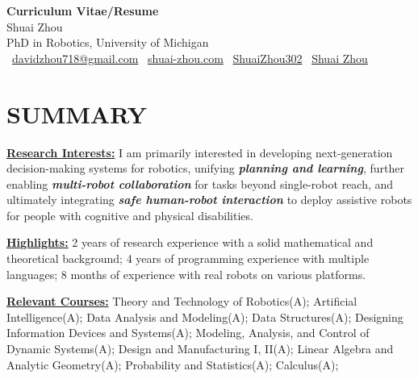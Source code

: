 \documentclass[a4paper,9pt]{extarticle}
\begin{document}
\pagestyle{fancy}
\renewcommand{\headrulewidth}{0pt}
\fancyhead{}
\thispagestyle{empty} %

\begin{center}
\textbf{\Huge Curriculum Vitae/Resume}\\[2pt] %
Shuai Zhou \\[2pt] PhD in Robotics, University of Michigan \\[2pt]
\faEnvelope\ \href{mailto:davidzhou718@gmail.com}{davidzhou718@gmail.com}
\quad \textbar{} \quad
\faHome\ \href{https://www.shuai-zhou.com}{shuai-zhou.com}
\quad \textbar{} \quad
\faGithub\ \href{https://github.com/ShuaiZhou302}{ShuaiZhou302}
\quad \textbar{} \quad
\faGraduationCap\ \href{https://scholar.google.com/citations?user=ONn1TXAAAAAJ&hl=en&oi=sra}{Shuai Zhou}
\end{center}

\section*{{\textbf{\fontsize{14pt}{8pt}\selectfont S}\textbf{\scshape UMMARY}}}
\underline{\textbf{Research Interests:}} I am primarily interested in developing next-generation decision-making systems for robotics, unifying \textit{\textbf{planning and learning}}, further enabling \textit{\textbf{multi-robot collaboration}} for tasks beyond single-robot reach, and ultimately integrating \textit{\textbf{safe human-robot interaction}} to deploy assistive robots for people with cognitive and physical disabilities.
\par\vspace{4pt}\noindent
\underline{\textbf{Highlights:}} 2 years of research experience with a solid mathematical and theoretical background; 4 years of programming experience with multiple languages; 8 months of experience with real robots on various platforms.
\par\vspace{4pt}\noindent
\underline{\textbf{Relevant Courses:}} Theory and Technology of Robotics(A); Artificial Intelligence(A); Data Analysis and Modeling(A); Data Structures(A); Designing Information Devices and Systems(A); Modeling, Analysis, and Control of Dynamic Systems(A); Design and Manufacturing I, II(A); Linear Algebra and Analytic Geometry(A); Probability and Statistics(A); Calculus(A);
\end{document}
